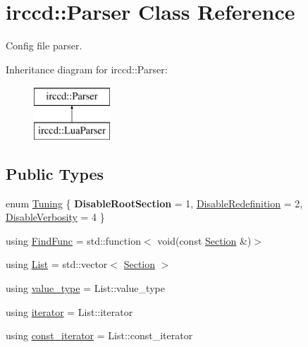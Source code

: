 \hypertarget{a00048}{\section{irccd\-:\-:Parser Class Reference}
\label{a00048}
}


Config file parser.  


Inheritance diagram for irccd\-:\-:Parser\-:\begin{figure}[H]
\begin{center}
\leavevmode
\includegraphics[height=2.000000cm]{a00048}
\end{center}
\end{figure}
\subsection*{Public Types}
\begin{DoxyCompactItemize}
\item 
enum \hyperlink{a00048_a612bd92551cf6ce883250fc83105181f}{Tuning} \{ {\bfseries Disable\-Root\-Section} = 1, 
\hyperlink{a00048_a612bd92551cf6ce883250fc83105181faeed0389531d53791e8da250fb0746773}{Disable\-Redefinition} = 2, 
\hyperlink{a00048_a612bd92551cf6ce883250fc83105181fad8fd745d26946c86e6a91028c9e88ae5}{Disable\-Verbosity} = 4
 \}
\item 
using \hyperlink{a00048_ae1acbe10817e492eff69dbc42c5483e8}{Find\-Func} = std\-::function$<$ void(const \hyperlink{a00054}{Section} \&)$>$
\item 
using \hyperlink{a00048_a5f86fe625aa3b3ef61465bba6b9104cb}{List} = std\-::vector$<$ \hyperlink{a00054}{Section} $>$
\item 
using \hyperlink{a00048_af12b2b64f8ae5823e05e61c49c1a7bb3}{value\-\_\-type} = List\-::value\-\_\-type
\item 
using \hyperlink{a00048_a94861c2c2808e8ae230f2186f8221b31}{iterator} = List\-::iterator
\item 
using \hyperlink{a00048_a57eed4a7d37e60168450abc8acda10b3}{const\-\_\-iterator} = List\-::const\-\_\-iterator
\end{DoxyCompactItemize}

